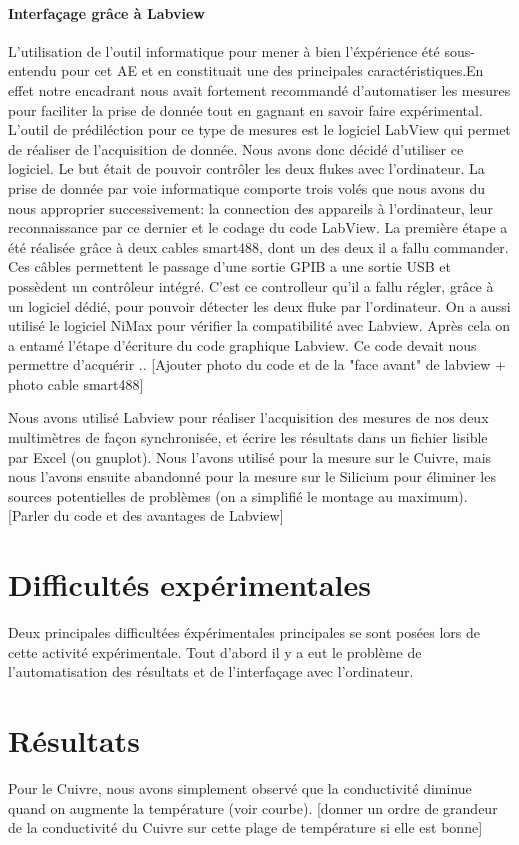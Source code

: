 \paragraph*{Interfaçage grâce à Labview}
L'utilisation de l'outil informatique pour mener à bien l'éxpérience été sous-entendu pour cet AE et en constituait une des principales caractéristiques.En effet notre encadrant nous avait fortement recommandé d'automatiser les mesures pour faciliter la prise de donnée tout en gagnant en savoir faire expérimental. L'outil de prédiléction pour ce type de mesures est le logiciel LabView qui permet de réaliser de l'acquisition de donnée. Nous avons donc décidé d'utiliser ce logiciel. Le but était de pouvoir contrôler les deux flukes avec l'ordinateur. La prise de donnée par voie informatique comporte trois volés que nous avons du nous approprier successivement: la connection des appareils à l'ordinateur, leur reconnaissance par ce dernier et le codage du code LabView. La première étape a été réalisée grâce à deux cables smart488, dont un des deux il a fallu commander. Ces câbles permettent le passage d'une sortie GPIB a une sortie USB et possèdent un contrôleur intégré. C'est ce controlleur qu'il a fallu régler, grâce à un logiciel dédié, pour pouvoir détecter les deux fluke par l'ordinateur. On a aussi utilisé le logiciel NiMax pour vérifier la compatibilité avec Labview. Après cela on a entamé l'étape d'écriture du code graphique Labview. Ce code devait nous permettre d'acquérir ..
[Ajouter photo du code et de la "face avant" de labview + photo cable smart488]

Nous avons utilisé Labview pour réaliser l'acquisition des mesures de nos deux multimètres de façon synchronisée, et écrire les résultats dans un fichier lisible par Excel (ou gnuplot).
Nous l'avons utilisé pour la mesure sur le Cuivre, mais nous l'avons ensuite abandonné pour la mesure sur le Silicium pour éliminer les sources potentielles de problèmes (on a simplifié le montage au maximum).
[Parler du code et des avantages de Labview]


\section*{Difficultés expérimentales}
Deux principales difficultées éxpérimentales principales se sont posées lors de cette activité expérimentale. 
Tout d'abord il y a eut le problème de l'automatisation des résultats et de l'interfaçage avec l'ordinateur. 

\section*{Résultats}
Pour le Cuivre, nous avons simplement observé que la conductivité diminue quand on augmente la température (voir courbe).
[donner un ordre de grandeur de la conductivité du Cuivre sur cette plage de température si elle est bonne]


